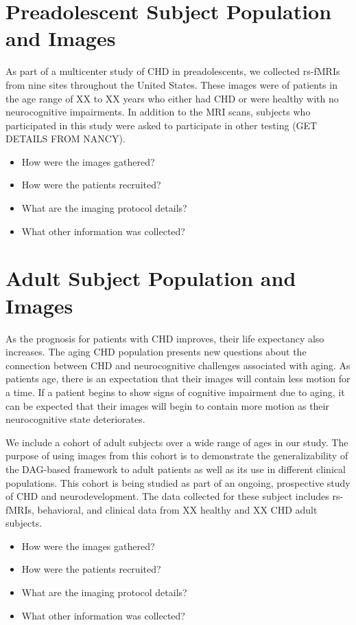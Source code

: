 \section{Preadolescent Subject Population and Images}

As part of a multicenter study of CHD in preadolescents, we collected rs-fMRIs from nine sites throughout the United States. These images were of patients in the age range of XX to XX years who either had CHD or were healthy with no neurocognitive impairments. In addition to the MRI scans, subjects who participated in this study were asked to participate in other testing (GET DETAILS FROM NANCY).

\begin{itemize}
\item How were the images gathered?
\item How were the patients recruited?
\item What are the imaging protocol details?
\item What other information was collected?
\end{itemize}


\section{Adult Subject Population and Images}

As the prognosis for patients with CHD improves, their life expectancy also increases. The aging CHD population presents new questions about the connection between CHD and neurocognitive challenges associated with aging. As patients age, there is an expectation that their images will contain less motion for a time. If a patient begins to show signs of cognitive impairment due to aging, it can be expected that their images will begin to contain more motion as their neurocognitive state deteriorates. 

We include a cohort of adult subjects over a wide range of ages in our study. The purpose of using images from this cohort is to demonstrate the generalizability of the DAG-based framework to adult patients as well as its use in different clinical populations. This cohort is being studied as part of an ongoing, prospective study of CHD and neurodevelopment. The data collected for these subject includes rs-fMRIs, behavioral, and clinical data from XX healthy and XX CHD adult subjects. 

\begin{itemize}
\item How were the images gathered?
\item How were the patients recruited?
\item What are the imaging protocol details?
\item What other information was collected?
\end{itemize}

